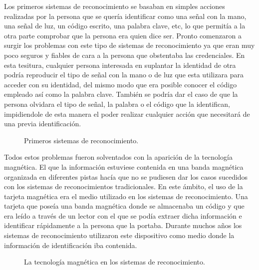 Los primeros sistemas de reconocimiento se basaban en simples acciones realizadas por la persona que se quería identificar como una señal con la mano, una señal de luz, un código escrito, una palabra clave, etc, lo que permitía a la otra parte comprobar que la persona era quien dice ser. Pronto comenzaron a surgir los problemas con este tipo de sistemas de reconocimiento ya que eran muy poco seguros y fiables de cara a la persona que obstentaba las credenciales. En esta tesitura, cualquier persona interesada en suplantar la identidad de otra podría reproducir el tipo de señal con la mano o de luz que esta utilizara para acceder con su identidad, del mismo modo que era posible conocer el código empleado así como la palabra clave. También se podría dar el caso de que la persona olvidara el tipo de señal, la palabra o el código que la identifican, impidiendole de esta manera el poder realizar cualquier acción que necesitará de una previa identificación. \\

\begin{figure}[htbp]
\centering
{}
\caption{Primeros sistemas de reconocimiento.} \label{fig:señales}
\end{figure}

Todos estos problemas fueron solventados con la aparición de la tecnología magnética. El que la información estuviese contenida en una banda magnética organizada en diferentes pistas hacía que no se pudiesen dar los casos sucedidos con los sistemas de reconocimientos tradicionales. En este ámbito, el uso de la tarjeta magnética era el medio utilizado en los sistemas de reconocimiento. Una tarjeta que poseía una banda magnética donde se almacenaba un código y que era leído a través de un lector con el que se podía extraer dicha información e identificar rápidamente a la persona que la portaba. Durante muchos años los sistemas de reconocimiento utilizaron este dispositivo como medio donde la información de identificación iba contenida. \\

\begin{figure}[htbp]
\centering
{}
\caption{La tecnología magnética en los sistemas de reconocimiento.} \label{fig:señales}
\end{figure}


